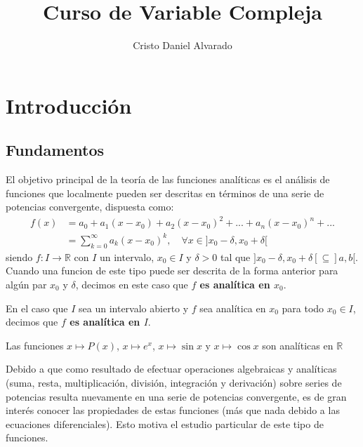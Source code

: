\documentclass[12pt]{report}
\theoremstyle{largebreak}
\newcommand\cf[3]{\ensuremath{#1:#2\rightarrow#3}}
\begin{document}
    \setlength{\parskip}{5pt} %
    \setlength{\parindent}{12pt} %
    \title{Curso de Variable Compleja}
    \author{Cristo Daniel Alvarado}
    \maketitle

    \tableofcontents %

    \chapter{Introducción}
    
    \section{Fundamentos}

    El objetivo principal de la teoría de las funciones analíticas es el análisis de funciones que localmente pueden ser descritas en términos de una serie de potencias convergente, dispuesta como:
    \begin{equation}
        \begin{split}
            f(x)&=a_0+a_1(x-x_0)+a_2(x-x_0)^2+...+a_n(x-x_0)^n+...\\
            &=\sum_{ k=0}^\infty a_k(x-x_0)^k,\quad\forall x\in]x_0-\delta,x_0+\delta[
        \end{split}
    \end{equation}
    siendo $\cf{f}{I}{\mathbb{R}}$ con $I$ un intervalo, $x_0\in I$ y $\delta>0$ tal que $]x_0-\delta,x_0+\delta[\subseteq]a,b[$. Cuando una funcion de este tipo puede ser descrita de la forma anterior para algún par $x_0$ y $\delta$, decimos en este caso que \textbf{$f$ es analítica en $x_0$}.

    En el caso que $I$ sea un intervalo abierto y $f$ sea analítica en $x_0$ para todo $x_0\in I$, decimos que \textbf{$f$ es analítica en $I$}.

    \begin{exa}
        Las funciones $x\mapsto P(x)$, $x\mapsto e^x$, $x\mapsto \sin x$ y $x\mapsto \cos x$ son analíticas en $\mathbb{R}$
    \end{exa}

    Debido a que como resultado de efectuar operaciones algebraicas y analíticas (suma, resta, multiplicación, división, integración y derivación) sobre series de potencias resulta nuevamente en una serie de potencias convergente, es de gran interés conocer las propiedades de estas funciones (más que nada debido a las ecuaciones diferenciales). Esto motiva el estudio particular de este tipo  de funciones.
\end{document}
